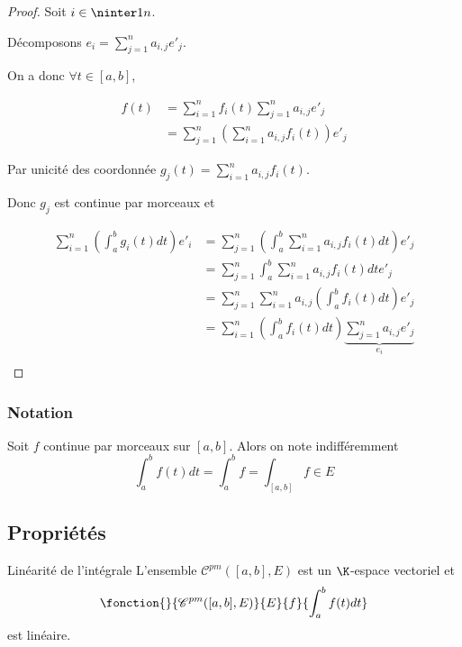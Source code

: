 
\begin{proof}
    Soit $i \in \ninter 1 n$. 

    Décomposons $e_i = \displaystyle \sum_{j=1}^n a_{i,j} e'_j$.

    On a donc $\forall t \in [a, b]$, 

    \begin{align*}
        f(t) & = \sum_{i=1}^n f_i(t) \sum_{j=1}^n a_{i,j} e'_j \\
        & = \sum_{j=1}^n \left( \sum_{i=1}^n a_{i,j} f_i(t) \right) e'_j
    \end{align*}

    Par unicité des coordonnée $\displaystyle g_j(t) = \sum_{i=1}^n a_{i,j} f_i(t)$.

    Donc $g_j$ est continue par morceaux et 

    \begin{align*}
        \sum_{i=1}^n \left( \int_a^b g_i(t) dt \right) e'_i & = \sum_{j=1}^n \left( \int_a^b \sum_{i=1}^n a_{i,j} f_i(t) dt \right) e'_j \\
            & = \sum_{j=1}^n \int_a^b \sum_{i=1}^n a_{i,j} f_i(t) dt e'_j \\
            & = \sum_{j=1}^n \sum_{i=1}^n a_{i,j} \left( \int_a^b f_i(t) dt \right) e'_j \\
            & = \sum_{i=1}^n \left( \int_a^b f_i(t) dt \right) \underbrace{\sum_{j=1}^n a_{i,j} e'_j}_{e_i} \\ 
    \end{align*}
\end{proof}

\subsubsection{Notation }

Soit $f$ continue par morceaux sur $[a, b]$. Alors on note indifféremment
$$\int_a^b f(t) dt = \int_a^b f = \int_{[a, b]} f \in E$$

\subsection{Propriétés }


\begin{proposition}{Linéarité de l'intégrale }{}
    L'ensemble $\mathscr C^{pm}([a, b], E)$ est un $\K$-espace vectoriel et 
    $$ \fonction{}{\mathscr C^{pm}([a, b], E)}{E}{f}{\int_a^b f(t) dt}$$ 
    est linéaire. 
\end{proposition}

